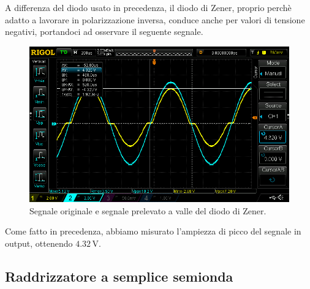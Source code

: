 \documentclass[a4paper]{article}
\begin{document}
{{%
				A differenza del diodo usato in precedenza, il diodo di Zener, proprio perchè adatto a lavorare in polarizzazione inversa, conduce anche per valori di tensione negativi, portandoci ad osservare il seguente segnale.		
				\begin{figure}[h!]
					\centering
					\includegraphics[scale=0.5]{ampiezzaDiPiccoDiodoDiZener}
					\caption{Segnale originale e segnale prelevato a valle del diodo di Zener.}
					\label{fig:ampiezzaDiPiccoDiodoDiZener}
				\end{figure}
				\newline
				Come fatto in precedenza, abbiamo misurato l'ampiezza di picco del segnale in output, ottenendo $ 4.32 \, \mathrm{V} $.
		\subsection{Raddrizzatore a semplice semionda}
}}
\end{document}
